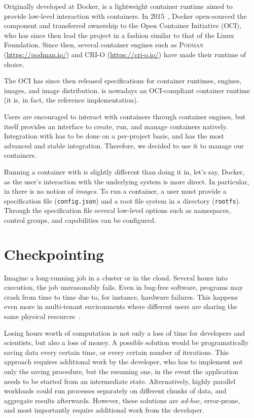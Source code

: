Originally developed at Docker, \runc is a lightweight container runtime aimed to provide low-level interaction with containers.
In 2015~\cite{introducing-runc}, Docker open-sourced the component and transferred ownership to the Open Container Initiative (OCI), who has since then lead the project in a fashion similar to that of the Linux Foundation.
Since then, several container engines such as \textsc{Podman} (\url{https://podman.io/}) and \textsc{CRI-O} (\url{https://cri-o.io/}) have made \runc their runtime of choice.

The OCI has since then released specifications for container runtimes, engines, images, and image distribution.
\runc is nowadays an OCI-compliant container runtime (it is, in fact, the reference implementation).

Users are encouraged to interact with containers through container engines, but \runc itself provides an interface to create, run, and manage containers natively.
Integration with \criu has to be done on a per-project basis, and \runc has the most advanced and stable integration.
Therefore, we decided to use it to manage our containers.

Running a container with \runc is slightly different than doing it in, let's say, Docker, as the user's interaction with the underlying system is more direct.
In particular, in \runc there is no notion of \textit{images}.
To run a container, a user must provide a specification file (\texttt{config.json}) and a root file system in a directory (\texttt{rootfs}).
Through the specification file several low-level options such as namespaces, control groups, and capabilities can be configured.

\section{Checkpointing}

Imagine a long-running job in a cluster or in the cloud.
Several hours into execution, the job unreasonably fails.
Even in bug-free software, programs may crash from time to time due to, for instance, hardware failures.
This happens even more in multi-tenant environments where different users are sharing the same physical resources~\cite{Barker2014}.

Losing hours worth of computation is not only a loss of time for developers and scientists, but also a loss of money.
A possible solution would be programatically saving data every certain time, or every certain number of iterations.
This approach requires additional work by the developer, who has to implement not only the saving procedure, but the resuming one, in the event the application needs to be started from an intermediate state.
Alternatively, highly parallel workloads could run processes separately on different chunks of data, and aggregate results afterwards.
However, these solutions are \textit{ad-hoc}, error-prone, and most importantly require additional work from the developer.

